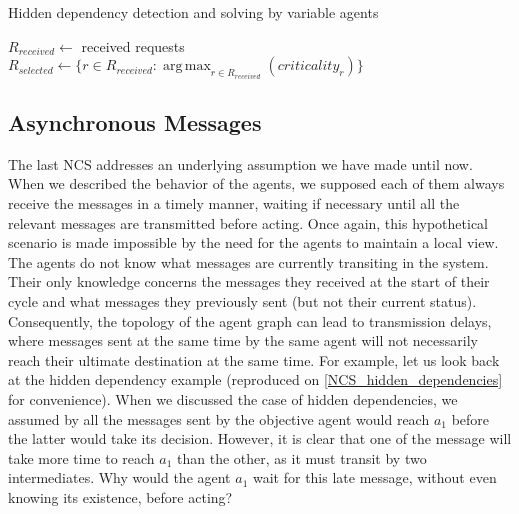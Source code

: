 \begin{algorithm}
\caption{Hidden dependency detection and solving by variable agents}
\label{algo_hidden_dependency_solving}

	$R_{received} \leftarrow $ received requests\;
	$R_{selected} \leftarrow \{ r \in R_{received} : \displaystyle\operatorname*{arg\,max}_{r \in R_{received}}(criticality_r) \}$\;


\end{algorithm}

\subsection{Asynchronous Messages}\label{NCS_async}

The last NCS addresses an underlying assumption we have made until now. When we described the behavior of the agents, we supposed each of them always receive the messages in a timely manner, waiting if necessary until all the relevant messages are transmitted before acting. Once again, this hypothetical scenario is made impossible by the need for the agents to maintain a local view. The agents do not know what messages are currently transiting in the system. Their only knowledge concerns the messages they received at the start of their cycle and what messages they previously sent (but not their current status). Consequently, the topology of the agent graph can lead to transmission delays, where messages sent at the same time by the same agent will not necessarily reach their ultimate destination at the same time. For example, let us look back at the hidden dependency example (reproduced on \figurename{} \ref{NCS_hidden_dependencies} for convenience). When we discussed the case of hidden dependencies, we assumed by all the messages sent by the objective agent would reach $a_1$ before the latter would take its decision. However, it is clear that one of the message will take more time to reach $a_1$ than the other, as it must transit by two intermediates. Why would the agent $a_1$ wait for this late message, without even knowing its existence, before acting?


